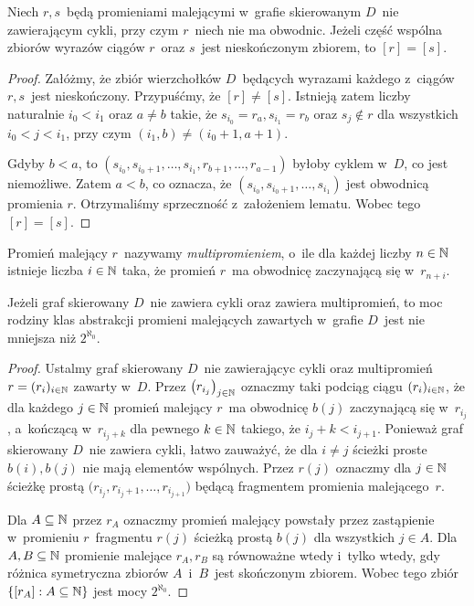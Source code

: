 \begin{lem}\label{lem-sk_przekroj_promieni_nierownowaznych}
Niech $r,s$~będą promieniami malejącymi w~grafie skierowanym $D$~nie zawierającym cykli, przy czym $r$~niech nie ma obwodnic. Jeżeli część wspólna zbiorów wyrazów ciągów $r$~oraz $s$~jest nieskończonym zbiorem, to $[r]=[s]$.
\end{lem}
\begin{proof}
Załóżmy, że zbiór wierzchołków $D$~będących wyrazami każdego z~ciągów $r, s$~jest nieskończony. Przypuśćmy, że $[r]\not=[s]$. Istnieją zatem liczby naturalnie $i_0<i_1$ oraz $a\not=b$ takie, że $s_{i_0}=r_a,s_{i_1}=r_b$ oraz $s_j\not\in r$ dla wszystkich $i_0<j<i_1$, przy czym $(i_1,b)\not=(i_0+1,a+1)$.

Gdyby $b<a$, to $\left(s_{i_0},s_{i_0+1},\ldots,s_{i_1},r_{b+1},\ldots,r_{a-1}\right)$ byłoby cyklem w~$D$, co jest niemożliwe. Zatem $a<b$, co oznacza, że $\left(s_{i_0},s_{i_0+1},\ldots,s_{i_1}\right)$ jest obwodnicą promienia $r$. Otrzymaliśmy sprzeczność z~założeniem lematu. Wobec tego $[r]=[s]$.
\end{proof}

Promień malejący $r$~nazywamy \textit{multipromieniem}, o~ile dla każdej liczby $n\in\mathbb{N}$ istnieje liczba $i\in\mathbb{N}$ taka, że promień $r$~ma obwodnicę zaczynającą się w~$r_{n+i}$.

\begin{lem}\label{prop_multiray}
Jeżeli graf skierowany  $D$~nie zawiera cykli oraz zawiera multipromień, to moc rodziny klas abstrakcji promieni malejących zawartych w~grafie $D$~jest nie mniejsza niż $2^{\aleph_0}$.
\end{lem}
\begin{proof}
Ustalmy graf skierowany $D$~nie zawierającyc cykli oraz multipromień $r=(r_i)_{i\in\mathbb{N}}$ zawarty w~$D$. Przez $\bigl(r_{i_j}\bigr)_{j\in\mathbb{N}}$ oznaczmy taki podciąg ciągu $(r_i)_{i\in\mathbb{N}}$, że dla każdego $j\in\mathbb{N}$ promień malejący $r$~ma obwodnicę $b(j)$ zaczynającą się w~$r_{i_j}$, a~kończącą w~$r_{i_j+k}$ dla pewnego $k\in\mathbb{N}$ takiego, że $i_j+k<i_{j+1}$. Ponieważ graf skierowany $D$~nie zawiera cykli, łatwo zauważyć, że dla $i\not=j$ ścieżki proste $b(i),b(j)$ nie mają elementów wspólnych. Przez $r(j)$ oznaczmy dla $j\in\mathbb{N}$ ścieżkę prostą $\bigl(r_{i_j},r_{i_j+1},\ldots,r_{i_{j+1}}\bigr)$ będącą fragmentem promienia malejącego~$r$.

Dla $A\subseteq\mathbb{N}$ przez $r_A$ oznaczmy promień malejący powstały przez zastąpienie w~promieniu $r$~fragmentu $r(j)$ ścieżką prostą $b(j)$ dla wszystkich $j\in A$. Dla $A,B\subseteq \mathbb{N}$ promienie malejące $r_A, r_B$ są równoważne wtedy i~tylko wtedy, gdy różnica symetryczna zbiorów $A$~i~$B$~jest skończonym zbiorem. Wobec tego zbiór $\left\{[r_A]:A\subseteq\mathbb{N}\right\}$ jest mocy $2^{\aleph_0}$.
\end{proof}

